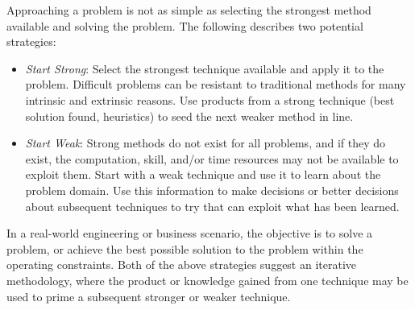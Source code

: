 \documentclass[a4paper, 11pt]{article}
\begin{document}
Approaching a problem is not as simple as selecting the strongest method available and solving the problem. The following describes two potential strategies:

\begin{itemize}
  \item \emph{Start Strong}: Select the strongest technique available and apply it to the problem. Difficult problems can be resistant to traditional methods for many intrinsic and extrinsic reasons. Use products from a strong technique (best solution found, heuristics) to seed the next weaker method in line. 
  \item \emph{Start Weak}: Strong methods do not exist for all problems, and if they do exist, the computation, skill, and/or time resources may not be available to exploit them. Start with a weak technique and use it to learn about the problem domain. Use this information to make decisions or better decisions about subsequent techniques to try that can exploit what has been learned.
\end{itemize}

In a real-world engineering or business scenario, the objective is to solve a problem, or achieve the best possible solution to the problem within the operating constraints.
Both of the above strategies suggest an iterative methodology, where the product or knowledge gained from one technique may be used to prime a subsequent stronger or weaker technique. 
\end{document}
